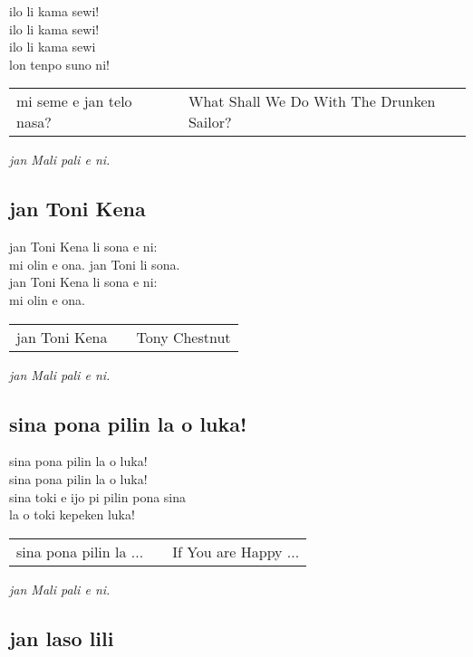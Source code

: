 ilo li kama sewi! \\
ilo li kama sewi! \\
ilo li kama sewi \\
lon tenpo suno ni! 

\begin{supertabular}{p{5,5cm}|ll}
mi seme e jan telo nasa? && What Shall We Do With The Drunken Sailor? \\
\end{supertabular}

\textit{jan Mali pali e ni. \cite{www:astrodonunt:01}}

\subsection{jan Toni Kena}

jan Toni Kena li sona e ni:  \\
mi olin e ona. jan Toni li sona.  \\
jan Toni Kena li sona e ni: \\
mi olin e ona.

\begin{supertabular}{p{5,5cm}|ll}
jan Toni Kena && Tony Chestnut \\
\end{supertabular}

\textit{jan Mali pali e ni. \cite{www:astrodonunt:01}}

\subsection{sina pona pilin la o luka!}

sina pona pilin la o luka!  \\
sina pona pilin la o luka!  \\
sina toki e ijo pi pilin pona sina  \\
la o toki kepeken luka!

\begin{supertabular}{p{5,5cm}|ll}
sina pona pilin la ... && If You are Happy ... \\
\end{supertabular}

\textit{jan Mali pali e ni. \cite{www:astrodonunt:01}}

\subsection{jan laso lili}

